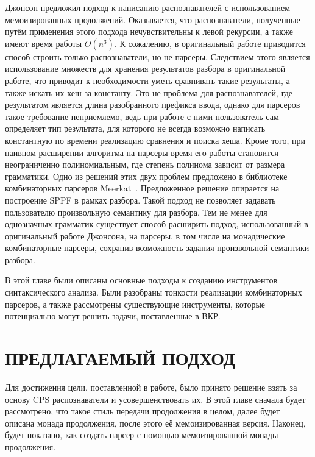 \documentclass[times]{itmo-student-thesis}
\begin{document}
Джонсон предложил подход к написанию распознавателей с использованием мемоизированных продолжений. Оказывается, что
распознаватели, полученные путём   применения этого подхода нечувствительны к левой рекурсии, а также имеют время
работы $O(n^3)$. К сожалению, в оригинальный работе приводится способ строить только распознаватели, но не
парсеры. Следствием этого является использование множеств для хранения результатов разбора в оригинальной работе, что
приводит к необходимости уметь сравнивать такие результаты, а также искать их хеш за константу. Это не проблема для
распознавателей, где результатом является длина разобранного префикса ввода, однако для парсеров такое требование
неприемлемо, ведь при работе с ними пользователь сам определяет тип результата, для которого не всегда возможно
написать константную по времени реализацию сравнения и поиска хеша. Кроме того, при наивном расширении алгоритма на
парсеры время его работы становится неограниченно полиномиальным, где степень полинома зависит от размера грамматики.
Одно из решений этих двух проблем предложено в библиотеке комбинаторных парсеров Meerkat~\cite{izmaylova_practical_2016}.
Предложенное решение опирается на построение SPPF в рамках разбора. Такой подход не позволяет задавать пользователю
произвольную семантику для разбора. Тем не менее для однозначных грамматик существует способ расширить подход,
использованный в оригинальный работе Джонсона, на парсеры, в том числе на монадические комбинаторные парсеры, сохранив
возможность задания произвольной семантики разбора.

\chapterconclusion

В этой главе были описаны основные подходы к созданию инструментов синтаксического анализа. Были разобраны тонкости
реализации  комбинаторных парсеров, а также рассмотрены существующие инструменты, которые потенциально могут решить
задачи, поставленные в ВКР.

\chapter{ПРЕДЛАГАЕМЫЙ ПОДХОД}

Для достижения цели, поставленной в работе, было принято решение взять за основу CPS распознаватели и усовершенствовать их.
В этой главе сначала будет рассмотрено, что такое стиль передачи продолжения в целом, далее будет описана монада продолжения,
после этого её мемоизированная версия. Наконец, будет показано, как создать парсер с помощью мемоизированной монады продолжения.
\end{document}
